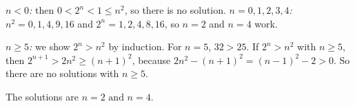 \emph{$n<0$:} then $0<2^n<1\le n^2$, so there is no solution. \emph{$n=0,1,2,3,4$:} $n^2=0,1,4,9,16$ and $2^n=1,2,4,8,16$, so $n=2$ and $n=4$ work.

\emph{$n\ge5$:} we show $2^n>n^2$ by induction. For $n=5$, $32>25$. If $2^n>n^2$ with $n\ge5$, then $2^{n+1}>2n^2\ge(n+1)^2$, because $2n^2-(n+1)^2=(n-1)^2-2>0$. So there are no solutions with $n\ge5$.

The solutions are $\boxed{n=2\text{ and }n=4}$.
